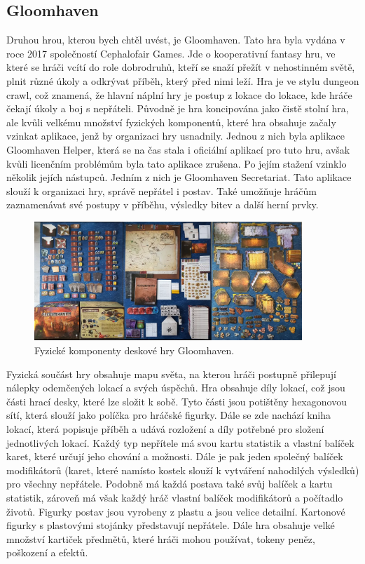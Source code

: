 \subsection{Gloomhaven}
Druhou hrou, kterou bych chtěl uvést, je Gloomhaven. Tato hra byla vydána v roce 2017 společností Cephalofair Games. Jde o kooperativní fantasy hru, ve které se hráči vcítí do role dobrodruhů, kteří se snaží přežít v nehostinném světě, plnit různé úkoly a odkrývat příběh, který před nimi leží. Hra je ve stylu dungeon crawl, což znamená, že hlavní náplní hry je postup z lokace do lokace, kde hráče čekají úkoly a boj s nepřáteli. Původně je hra koncipována jako čistě stolní hra, ale kvůli velkému množství fyzických komponentů, které hra obsahuje začaly vzinkat aplikace, jenž by organizaci hry usnadnily. Jednou z nich byla aplikace Gloomhaven Helper\cite{gloomhaven_helper}, která se na čas stala i oficiální aplikací pro tuto hru, avšak kvůli licenčním problémům byla tato aplikace zrušena. Po jejím stažení vzinklo několik jejích nástupců. Jedním z nich je Gloomhaven Secretariat\cite{gloomhaven_secretariat}. Tato aplikace slouží k organizaci hry, správě nepřátel i postav. Také umožňuje hráčům zaznamenávat své postupy v příběhu, výsledky bitev a další herní prvky.

\begin{figure}[H]
    \centering
    \includegraphics[width=0.9\textwidth]{resources/figures/gloomhaven.png}
    \caption{Fyzické komponenty deskové hry Gloomhaven.\cite{gloomhaven}}
    \label{fig:gloomhaven_contents}
\end{figure}

Fyzická součást hry obsahuje mapu světa, na kterou hráči postupně přilepují nálepky odemčených lokací a svých úspěchů. Hra obsahuje díly lokací, což jsou části hrací desky, které lze složit k sobě. Tyto části jsou potištěny hexagonovou sítí, která slouží jako políčka pro hráčské figurky. Dále se zde nachází kniha lokací, která popisuje příběh a udává rozložení a díly potřebné pro složení jednotlivých lokací. Každý typ nepřítele má svou kartu statistik a vlastní balíček karet, které určují jeho chování a možnosti. Dále je pak jeden společný balíček modifikátorů (karet, které namísto kostek slouží k vytváření nahodilých výsledků) pro všechny nepřátele. Podobně má každá postava také svůj balíček a kartu statistik, zároveň má však každý hráč vlastní balíček modifikátorů a počítadlo životů. Figurky postav jsou vyrobeny z plastu a jsou velice detailní. Kartonové figurky s plastovými stojánky představují nepřátele. Dále hra obsahuje velké množství kartiček předmětů, které hráči mohou používat, tokeny peněz, poškození a efektů.
